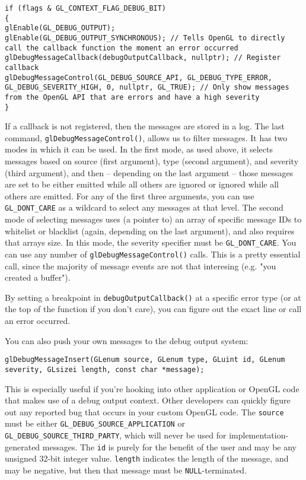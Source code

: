 \documentclass[8pt, table, xcdraw]{article}%
\begin{document}
\begin{lstlisting}
if (flags & GL_CONTEXT_FLAG_DEBUG_BIT)
{
glEnable(GL_DEBUG_OUTPUT);
glEnable(GL_DEBUG_OUTPUT_SYNCHRONOUS); // Tells OpenGL to directly call the callback function the moment an error occurred
glDebugMessageCallback(debugOutputCallback, nullptr); // Register callback
glDebugMessageControl(GL_DEBUG_SOURCE_API, GL_DEBUG_TYPE_ERROR, GL_DEBUG_SEVERITY_HIGH, 0, nullptr, GL_TRUE); // Only show messages from the OpenGL API that are errors and have a high severity
} 
\end{lstlisting}

If a callback is not registered, then the messages are stored in a log. The last command, \lstinline|glDebugMessageControl()|, allows us to filter messages. It has two modes in which it can be used. In the first mode, as used above, it selects messages based on source (first argument), type (second argument), and severity (third argument), and then -- depending on the last argument -- those messages are set to be either emitted while all others are ignored or ignored while all others are emitted. For any of the first three arguments, you can use \lstinline{GL_DONT_CARE} as a wildcard to select any messages at that level. The second mode of selecting messages uses (a pointer to) an array of specific message IDs to whitelist or blacklist (again, depending on the last argument), and also requires that arrays size. In this mode, the severity specifier must be \lstinline{GL_DONT_CARE}. You can use any number of \lstinline|glDebugMessageControl()| calls. This is a pretty essential call, since the majority of message events are not that interesing (e.g. "you created a buffer").

By setting a breakpoint in \lstinline|debugOutputCallback()| at a specific error type (or at the top of the function if you don't care), you can figure out the exact line or call an error occurred.

You can also push your own messages to the debug output system:

\begin{lstlisting}
glDebugMessageInsert(GLenum source, GLenum type, GLuint id, GLenum severity, GLsizei length, const char *message);
\end{lstlisting}

This is especially useful if you're hooking into other application or OpenGL code that makes use of a debug output context. Other developers can quickly figure out any reported bug that occurs in your custom OpenGL code. The \lstinline{source} must be either \lstinline{GL_DEBUG_SOURCE_APPLICATION} or \lstinline{GL_DEBUG_SOURCE_THIRD_PARTY}, which will never be used for implementation-generated messages. The \lstinline{id} is purely for the benefit of the user and may be any unsigned 32-bit integer value. \lstinline{length} indicates the length of the message, and may be negative, but then that message must be \lstinline{NULL}-terminated.
\end{document}
